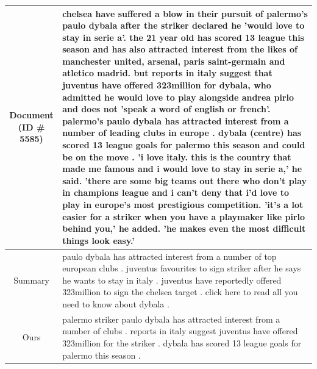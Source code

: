 \begin{table}[bth!]
\begin{tabular}{c|p{}}
  \makecell{Document\\(ID \# 5585)} & chelsea have suffered a blow in their pursuit of palermo's paulo dybala after the striker declared he 'would love to stay in serie a'. the 21 year old has scored 13 league this season and has also attracted interest from the likes of manchester united, arsenal, paris saint-germain and atletico madrid. but reports in italy suggest that juventus have offered 323million for dybala, who admitted he would love to play alongside andrea pirlo and does not 'speak a word of english or french'. palermo's paulo dybala has attracted interest from a number of leading clubs in europe . dybala (centre) has scored 13 league goals for palermo this season and could be on the move . 'i love italy. this is the country that made me famous and i would love to stay in serie a,' he said. 'there are some big teams out there who don't play in champions league and i can't deny that i'd love to play in europe's most prestigious competition. 'it's a lot easier for a striker when you have a playmaker like pirlo behind you,' he added. 'he makes even the most difficult things look easy.' \\\hline
  Summary & paulo dybala has attracted interest from a number of top european clubs . juventus favourites to sign striker after he says he wants to stay in italy . juventus have reportedly offered 323million to sign the chelsea target . click here to read all you need to know about dybala . \\\hline
  Ours & palermo striker paulo dybala has attracted interest from a number of clubs . reports in italy suggest juventus have offered 323million for the striker . dybala has scored 13 league goals for palermo this season . \\ \hline
  

\end{tabular}
\end{table}
